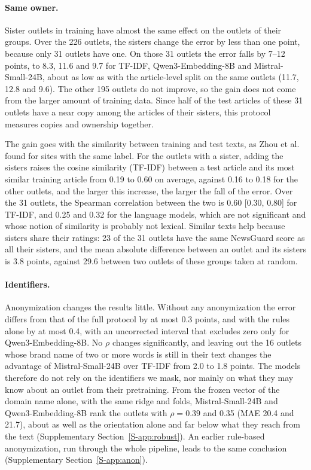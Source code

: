 \documentclass[11pt,a4paper]{article}
\begin{document}
\paragraph{Same owner.} Sister outlets in training have almost the same effect on the outlets of their groups. Over the 226
outlets, the sisters change the error by less than one point, because only 31 outlets have one. On those 31 outlets the
error falls by 7--12 points, to 8.3, 11.6 and 9.7 for TF-IDF, Qwen3-Embedding-8B and Mistral-Small-24B, about as low as
with the article-level split on the same outlets (11.7, 12.8 and 9.6). The other 195 outlets do not improve, so the gain
does not come from the larger amount of training data. Since half of the test articles of these 31 outlets have a near
copy among the articles of their sisters, this protocol measures copies and ownership together.

The gain goes with the similarity between training and test texts, as Zhou et al.~\cite{zhou2021hidden} found for sites
with the same label. For the outlets with a sister, adding the sisters raises the cosine similarity (TF-IDF) between a
test article and its most similar training article from 0.19 to 0.60 on average, against 0.16 to 0.18 for the other
outlets, and the larger this increase, the larger the fall of the error. Over the 31 outlets, the Spearman correlation
between the two is 0.60 [0.30, 0.80] for TF-IDF, and 0.25 and 0.32 for the language models, which are not significant
and whose notion of similarity is probably not lexical. Similar texts help because sisters share their ratings: 23 of
the 31 outlets have the same NewsGuard score as all their sisters, and the mean absolute difference between an outlet
and its sisters is 3.8 points, against 29.6 between two outlets of these groups taken at random.

\paragraph{Identifiers.} Anonymization changes the results little. Without any anonymization the error differs from that
of the full protocol by at most 0.3 points, and with the rules alone by at most 0.4, with an uncorrected interval that
excludes zero only for Qwen3-Embedding-8B. No $\rho$ changes significantly, and leaving out the 16 outlets whose brand
name of two or more words is still in their text changes the advantage of Mistral-Small-24B over TF-IDF from 2.0 to 1.8
points. The models therefore do not rely on the identifiers we mask, nor mainly on what they may know about an outlet
from their pretraining. From the frozen vector of the domain name alone, with the same ridge and folds,
Mistral-Small-24B and Qwen3-Embedding-8B rank the outlets with $\rho = 0.39$ and 0.35 (MAE 20.4 and 21.7), about as well
as the orientation alone and far below what they reach from the text (Supplementary Section~\ref{S-app:robust}). An
earlier rule-based anonymization, run through the whole pipeline, leads to the same conclusion (Supplementary
Section~\ref{S-app:anon}).
\end{document}
